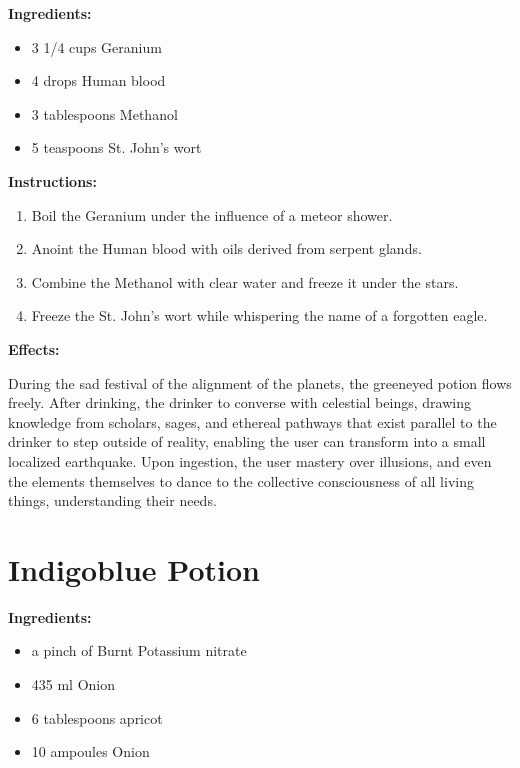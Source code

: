 \documentclass{article}
\begin{document}
\textbf{Ingredients:}

\begin{itemize}
  \item 3 1/4 cups Geranium
  \item 4 drops Human blood
  \item 3 tablespoons Methanol
  \item 5 teaspoons St. John's wort
\end{itemize}

\textbf{Instructions:}

\begin{enumerate}
  \item Boil the Geranium under the influence of a meteor shower.
  \item Anoint the Human blood with oils derived from serpent glands.
  \item Combine the Methanol with clear water and freeze it under the stars.
  \item Freeze the St. John's wort while whispering the name of a forgotten eagle.
\end{enumerate}

\textbf{Effects:}

During the sad festival of the alignment of the planets, the greeneyed potion flows freely. After drinking, the drinker to converse with celestial beings, drawing knowledge from scholars, sages, and ethereal pathways that exist parallel to the drinker to step outside of reality, enabling the user can transform into a small localized earthquake. Upon ingestion, the user mastery over illusions, and even the elements themselves to dance to the collective consciousness of all living things, understanding their needs.

\newpage
\section*{Indigoblue Potion}

\textbf{Ingredients:}

\begin{itemize}
  \item a pinch of Burnt Potassium nitrate
  \item 435 ml Onion
  \item 6 tablespoons apricot
  \item 10 ampoules Onion
\end{itemize}
\end{document}
